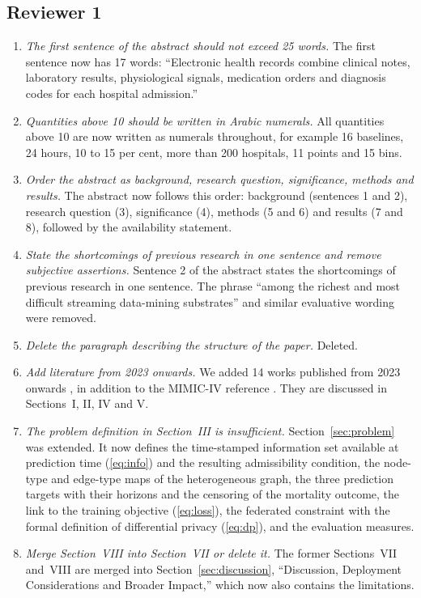 \documentclass[conference]{IEEEtran}
\begin{document}
\subsection*{Reviewer 1}
\begin{enumerate}
\item \textit{The first sentence of the abstract should not exceed 25 words.} The first sentence now has 17 words: ``Electronic health records combine clinical notes, laboratory results, physiological signals, medication orders and diagnosis codes for each hospital admission.''
\item \textit{Quantities above 10 should be written in Arabic numerals.} All quantities above 10 are now written as numerals throughout, for example 16 baselines, 24 hours, 10 to 15 per cent, more than 200 hospitals, 11 points and 15 bins.
\item \textit{Order the abstract as background, research question, significance, methods and results.} The abstract now follows this order: background (sentences 1 and 2), research question (3), significance (4), methods (5 and 6) and results (7 and 8), followed by the availability statement.
\item \textit{State the shortcomings of previous research in one sentence and remove subjective assertions.} Sentence 2 of the abstract states the shortcomings of previous research in one sentence. The phrase ``among the richest and most difficult streaming data-mining substrates'' and similar evaluative wording were removed.
\item \textit{Delete the paragraph describing the structure of the paper.} Deleted.
\item \textit{Add literature from 2023 onwards.} We added 14 works published from 2023 onwards \cite{li2023hibehrt,yang2023transformehr,jiang2023nyutron,wornow2023,zhang2023icml,jiang2024graphcare,ponomareva2023,kapoor2023,vandewater2024,moor2023,kamran2024,collins2024tripodai,ying2023fedecg,alsentzer2025shepherd}, in addition to the MIMIC-IV reference \cite{johnson2023mimiciv}. They are discussed in Sections~I, II, IV and V.
\item \textit{The problem definition in Section~III is insufficient.} Section~\ref{sec:problem} was extended. It now defines the time-stamped information set available at prediction time (\ref{eq:info}) and the resulting admissibility condition, the node-type and edge-type maps of the heterogeneous graph, the three prediction targets with their horizons and the censoring of the mortality outcome, the link to the training objective (\ref{eq:loss}), the federated constraint with the formal definition of differential privacy (\ref{eq:dp}), and the evaluation measures.
\item \textit{Merge Section~VIII into Section~VII or delete it.} The former Sections~VII and~VIII are merged into Section~\ref{sec:discussion}, ``Discussion, Deployment Considerations and Broader Impact,'' which now also contains the limitations.
\end{enumerate}
\end{document}
